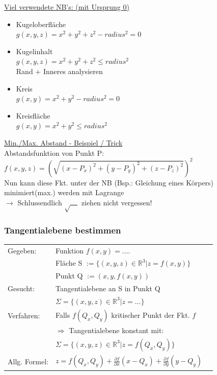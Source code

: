 \documentclass[6pt]{article}
\begin{document}
\begin{multicols*}{3}
	\underline{Viel verwendete NB's: (mit Ursprung 0)}
	\begin{itemize}[ itemsep=2pt, parsep=2pt]
		\item 	Kugeloberfl{\"a}che   \\
					$g(x,y,z) = x^2 + y^2 + z^2 - radius^2 =0$  		
		\item 	Kugelinhalt \\
					$g(x,y,z) = x^2 + y^2 + z^2 \leq radius^2 $ \\
					Rand + Inneres analysieren
		\item 	Kreis \\
					$g(x,y) = x^2 + y^2 - radius^2 = 0$  
		\item 	Kreisfl{\"a}che \\
					$g(x,y) = x^2 + y^2 \leq radius^2$ 
	\end{itemize}
	
	\underline{Min./Max. Abstand - Beispiel / Trick} \vspace{1mm}\\
	Abstandsfunktion von Punkt P: \vspace{1mm}\\
	$f(x,y,z) = {\left(\sqrt{(x-P_x)^2 + (y-P_y)^2 + (z-P_z)^2}\right)}^2$ \vspace{2mm}\\
	Nun kann diese Fkt. unter der NB (Bsp.: Gleichung eines K{\"o}rpers) minimiert(max.) werden mit Lagrange \\
	$\rightarrow$ Schlussendlich $\sqrt{\quad}$ ziehen nicht vergessen!

	
	\subsubsection*{Tangentialebene bestimmen}
		\begin{tabular}{lll}
		Gegeben: 		&	Funktion $f(x,y) = ....$ \\
							&	Fl{\"a}che S $:= \{ (x,y,z)  \in \mathbb{R}^3 | z=f(x,y) \}$ \\
							&  Punkt Q $:= (x, y, f(x,y))$ \vspace{1mm}\\
		Gesucht:		& Tangentialebene an S in Punkt Q \\
							& $\Sigma = \{  (x,y,z) \in \mathbb{R}^3 | z = ... \}$ \vspace{1mm}\\
		Verfahren: 	& Falls $f(Q_x,Q_y)$ kritischer Punkt der Fkt. $f$ \\
							& $\Rightarrow$ Tangentialebene konstant mit: \\
							& $\Sigma = \{  (x,y,z) \in \mathbb{R}^3 | z = f(Q_x,Q_y) \}$ \vspace{3mm}\\
		Allg. Formel: & $z = f(Q_x,Q_y) + \frac{\partial f}{\partial x} (x - Q_x) + \frac{\partial f}{\partial y} (y - 					Q_y) $ \\				 
		\end{tabular}
	

\end{multicols*}
\end{document}
